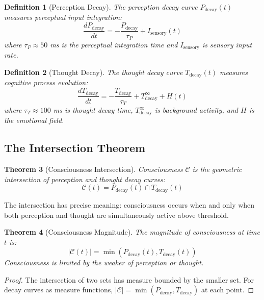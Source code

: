 \documentclass[twocolumn,amsmath,amssymb,aps,prl,superscriptaddress]{revtex4-2}
\newtheorem{theorem}{Theorem}[section]
\newtheorem{definition}[theorem]{Definition}
\newcommand{\Ccat}{\mathcal{C}}
\newcommand{\Pdecay}{P_{\text{decay}}}
\newcommand{\Tdecay}{T_{\text{decay}}}
\newcommand{\Hfield}{H}
\begin{document}
\begin{definition}[Perception Decay]
The perception decay curve $\Pdecay(t)$ measures perceptual input integration:
\begin{equation}
\frac{d\Pdecay}{dt} = -\frac{\Pdecay}{\tau_P} + I_{\text{sensory}}(t)
\end{equation}
where $\tau_P \approx 50$ ms is the perceptual integration time and $I_{\text{sensory}}$ is sensory input rate.
\end{definition}

\begin{definition}[Thought Decay]
The thought decay curve $\Tdecay(t)$ measures cognitive process evolution:
\begin{equation}
\frac{d\Tdecay}{dt} = -\frac{\Tdecay}{\tau_T} + T^{\infty}_{\text{decay}} + \Hfield(t)
\end{equation}
where $\tau_T \approx 100$ ms is thought decay time, $T^{\infty}_{\text{decay}}$ is background activity, and $\Hfield$ is the emotional field.
\end{definition}

\subsection{The Intersection Theorem}

\begin{theorem}[Consciousness Intersection]
\label{thm:consciousness}
Consciousness $\Ccat$ is the geometric intersection of perception and thought decay curves:
\begin{equation}
\boxed{\Ccat(t) = \Pdecay(t) \cap \Tdecay(t)}
\end{equation}
\end{theorem}

The intersection has precise meaning: consciousness occurs when and only when both perception and thought are simultaneously active above threshold.

\begin{theorem}[Consciousness Magnitude]
\label{thm:magnitude}
The magnitude of consciousness at time $t$ is:
\begin{equation}
\boxed{|\Ccat(t)| = \min(\Pdecay(t), \Tdecay(t))}
\end{equation}
Consciousness is limited by the weaker of perception or thought.
\end{theorem}

\begin{proof}
The intersection of two sets has measure bounded by the smaller set. For decay curves as measure functions, $|\Ccat| = \min(\Pdecay, \Tdecay)$ at each point.
\end{proof}
\end{document}
